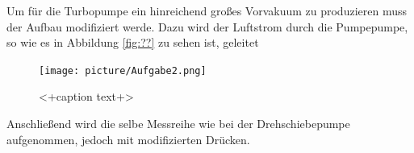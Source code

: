 Um für die Turbopumpe ein hinreichend großes Vorvakuum zu produzieren muss der Aufbau modifiziert werde. Dazu wird der Luftstrom durch die Pumpepumpe, so wie es in Abbildung \ref{fig:??} zu sehen ist, geleitet
\begin{figure}[htpb]
  \centering
  \texttt{[image: picture/Aufgabe2.png]}
  \caption{<+caption text+>}
  \label{fig:<+label+>}
\end{figure}
Anschließend wird die selbe Messreihe wie bei der Drehschiebepumpe aufgenommen,  jedoch mit modifizierten Drücken. 
